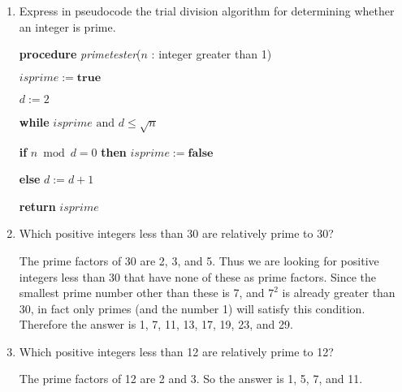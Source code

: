 \documentclass[11pt]{article}
\begin{document}
\begin{enumerate}[label=\textbf{\arabic*.}]
\begin{enumerate}[label=\textbf{\alph*)}]
		$729 = 3 \cdot 243 = 3 \cdot 3 \cdot 81 = 3 \cdot 3 \cdot 3 \cdot 27 = 3 \cdot 3 \cdot 3 \cdot 3 \cdot 9 = 3 \cdot 3 \cdot 3 \cdot 3 \cdot 3 \cdot 3 = 3^6$
		
		\item 1001
		
		$1001 = 7 \cdot 143 = 7 \cdot 11 \cdot 13$
		
		\item 1111
		
		$1111 = 11 \cdot 101$
		
		\item 909,090
		
		$909090 = 2 \cdot 454545 = 2 \cdot 3 \cdot 151515 = 2 \cdot 3 \cdot 3 \cdot 50505 = 2 \cdot 3 \cdot 3 \cdot 3 \cdot 16835 = 2 \cdot 3 \cdot 3 \cdot \cdot 5 \cdot 3367 = 2 \cdot 3 \cdot 3 \cdot \cdot 5 \cdot 7 \cdot 481 = 2 \cdot 3 \cdot 3 \cdot \cdot 5 \cdot 7 \cdot 13 \cdot 37 = 2 \cdot 3^3 \cdot 5 \cdot 7 \cdot 13 \cdot 37$
	\end{enumerate}

	\pagebreak
	\item Express in pseudocode the trial division algorithm for determining whether an integer is prime.
	
	\textbf{procedure} \emph{primetester}($n$ : integer greater than 1)
	
	$isprime := \textbf{true}$
	
	$d := 2$
	
	\textbf{while} $isprime \text{ and } d \leq \sqrt{n}$
	
	\qquad \textbf{if} $n \bmod d = 0$ \textbf{then} $isprime := \textbf{false}$
	
	\qquad \textbf{else} $d := d + 1$
	
	\textbf{return} $isprime$
	
	\item Which positive integers less than 30 are relatively prime to 30?
	
	The prime factors of 30 are 2, 3, and 5. Thus we are looking for positive integers less than 30 that have none of these as prime factors. Since the smallest prime number other than these is 7, and $7^2$ is already greater than 30, in fact only primes (and the number 1) will satisfy this condition. Therefore the answer is 1, 7, 11, 13, 17, 19, 23, and 29.
	
	\item Which positive integers less than 12 are relatively prime to 12?

	The prime factors of 12 are 2 and 3. So the answer is 1, 5, 7, and 11.
	

\end{enumerate}
\end{document}

